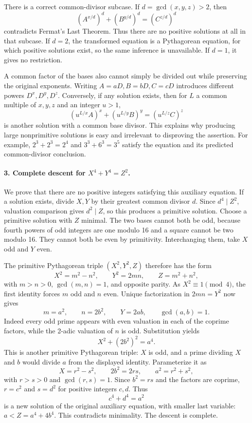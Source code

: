 \documentclass[11pt]{article}
\begin{document}
There is a correct common-divisor subcase. If $d=\gcd(x,y,z)>2$, then
\[
 (A^{x/d})^d+(B^{y/d})^d=(C^{z/d})^d
\]
contradicts Fermat's Last Theorem. Thus there are no positive solutions at all in that subcase. If $d=2$, the transformed equation is a Pythagorean equation, for which positive solutions exist, so the same inference is unavailable. If $d=1$, it gives no restriction.

A common factor of the bases also cannot simply be divided out while preserving the original exponents. Writing $A=aD,B=bD,C=cD$ introduces different powers $D^x,D^y,D^z$. Conversely, if any solution exists, then for $L$ a common multiple of $x,y,z$ and an integer $u>1$,
\[
 (u^{L/x}A)^x+(u^{L/y}B)^y=(u^{L/z}C)^z
\]
is another solution with a common base divisor. This explains why producing large nonprimitive solutions is easy and irrelevant to disproving the assertion. For example, $2^3+2^3=2^4$ and $3^3+6^3=3^5$ satisfy the equation and its predicted common-divisor conclusion.

\paragraph{3. Complete descent for $X^4+Y^4=Z^2$.}
We prove that there are no positive integers satisfying this auxiliary equation. If a solution exists, divide $X,Y$ by their greatest common divisor $d$. Since $d^4\mid Z^2$, valuation comparison gives $d^2\mid Z$, so this produces a primitive solution. Choose a primitive solution with $Z$ minimal. The two bases cannot both be odd, because fourth powers of odd integers are one modulo 16 and a square cannot be two modulo 16. They cannot both be even by primitivity. Interchanging them, take $X$ odd and $Y$ even.

The primitive Pythagorean triple $(X^2,Y^2,Z)$ therefore has the form
\[
 X^2=m^2-n^2,\qquad Y^2=2mn,\qquad Z=m^2+n^2,
\]
with $m>n>0$, $\gcd(m,n)=1$, and opposite parity. As $X^2\equiv1\pmod4$, the first identity forces $m$ odd and $n$ even. Unique factorization in $2mn=Y^2$ now gives
\[
 m=a^2,\qquad n=2b^2,\qquad Y=2ab,
 \qquad \gcd(a,b)=1.
\]
Indeed every odd prime appears with even valuation in each of the coprime factors, while the 2-adic valuation of $n$ is odd. Substitution yields
\[
 X^2+(2b^2)^2=a^4.
\]
This is another primitive Pythagorean triple: $X$ is odd, and a prime dividing $X$ and $b$ would divide $a$ from the displayed identity. Parameterize it as
\[
 X=r^2-s^2,\qquad 2b^2=2rs,\qquad a^2=r^2+s^2,
\]
with $r>s>0$ and $\gcd(r,s)=1$. Since $b^2=rs$ and the factors are coprime, $r=c^2$ and $s=d^2$ for positive integers $c,d$. Thus
\[
 c^4+d^4=a^2
\]
is a new solution of the original auxiliary equation, with smaller last variable: $a<Z=a^4+4b^4$. This contradicts minimality. The descent is complete.
\end{document}
